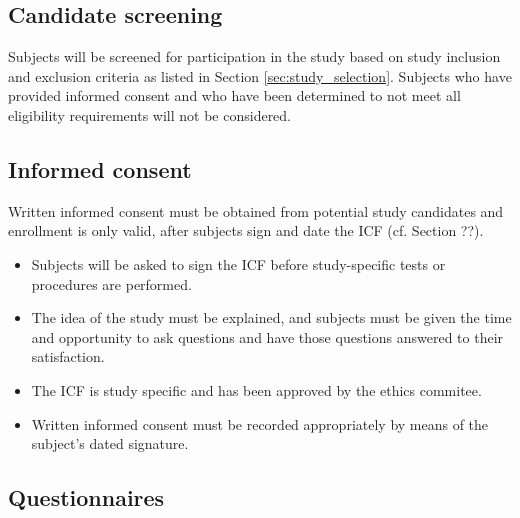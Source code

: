 
\subsection{Candidate screening}
\label{subsec:screening}
Subjects will be screened for participation in the study based on study inclusion and exclusion criteria as listed in Section \ref{sec:study_selection}. Subjects who have provided informed consent and who have been determined to not meet all eligibility requirements will not be considered.

\subsection{Informed consent}
Written informed consent must be obtained from potential study candidates and enrollment is only valid, after subjects sign and date the \ac{ICF} (cf. Section ??).
\begin{itemize}
\item Subjects will be asked to sign the \ac{ICF} before study-specific tests or procedures are performed.
\item The idea of the study must be explained, and subjects must be given the time and opportunity to ask questions and have those questions answered to their satisfaction.
\item The \ac{ICF} is study specific and has been approved by the ethics commitee.
\item Written informed consent must be recorded appropriately by means of the subject’s dated signature.
\end{itemize}

\subsection{Questionnaires}
\label{subsec:questionnaires}
